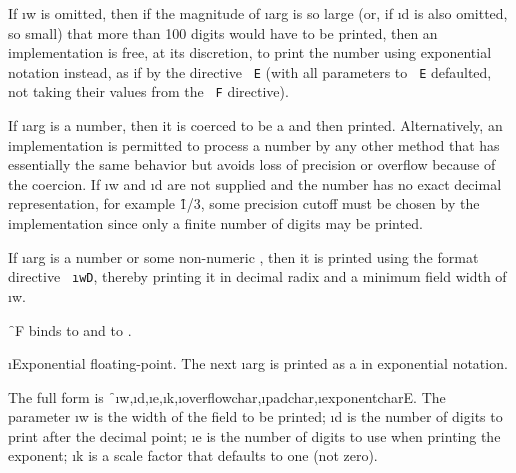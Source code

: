 If \i{w} is omitted, then if the magnitude of \i{arg} is so large (or, if
\i{d} is also omitted, so small) that more than 100 digits would have to
be printed, then an implementation is free, at its discretion, to print
the number using exponential notation instead, as if by the directive
{\tt ~E} (with all parameters to {\tt ~E} defaulted, not
taking their values from the {\tt ~F} directive).

If \i{arg} is a  
number, then it is coerced to be a 
and then printed.  Alternatively, an implementation is permitted to
process a  
number by any other method that has essentially the
same behavior but avoids loss of precision or overflow
because of the coercion.  If \i{w} and \i{d} are
not supplied and the number has no exact decimal representation,
for example \f{1/3}, some precision cutoff must be chosen
by the implementation since only a finite number of digits may be printed.

If \i{arg} is a  number or some non-numeric
, 
then it is printed using the format directive {\tt ~\i{w}D},
thereby printing it in decimal radix and a minimum field width of \i{w}.

\f{~F} binds
     to 
 and  to .


\i{Exponential floating-point}.
The next \i{arg} is printed as a  in exponential notation.

The full form is
\f{~\i{w},\i{d},\i{e},\i{k},\i{overflowchar},\i{padchar},\i{exponentchar}E}.
The parameter \i{w}
is the width of the field to be printed; \i{d} is the number
of digits to print after the decimal point; \i{e} is the number
of digits to use when printing the exponent;
\i{k} is a scale factor that defaults to one (not zero).

